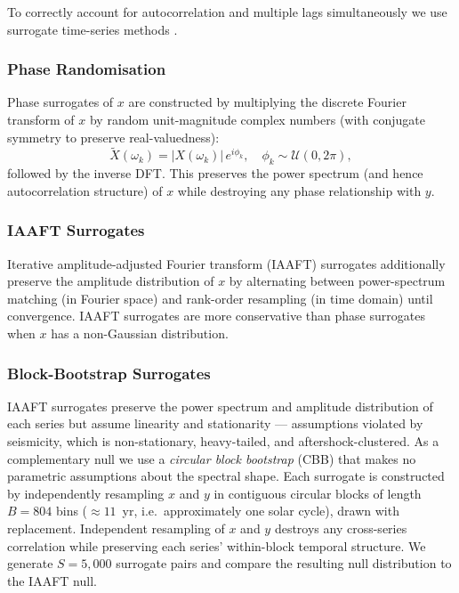 \documentclass[12pt,a4paper]{article}
\begin{document}
To correctly account for autocorrelation and multiple lags simultaneously we
use surrogate time-series methods \citep{Theiler1992,Schreiber2000}.

\subsubsection{Phase Randomisation}
\label{sec:phase}

Phase surrogates of $x$ are constructed by multiplying the discrete Fourier
transform of $x$ by random unit-magnitude complex numbers (with conjugate
symmetry to preserve real-valuedness):
\begin{equation}
  \tilde{X}(\omega_k) = |X(\omega_k)| \, e^{i\phi_k},
  \quad \phi_k \sim \mathcal{U}(0, 2\pi),
  \label{eq:phase}
\end{equation}
followed by the inverse DFT.
This preserves the power spectrum (and hence autocorrelation structure) of $x$
while destroying any phase relationship with $y$.

\subsubsection{IAAFT Surrogates}
\label{sec:iaaft}

Iterative amplitude-adjusted Fourier transform (IAAFT) surrogates
\citep{Schreiber2000} additionally preserve the amplitude distribution of $x$
by alternating between power-spectrum matching (in Fourier space) and
rank-order resampling (in time domain) until convergence.
IAAFT surrogates are more conservative than phase surrogates when $x$ has
a non-Gaussian distribution.

\subsubsection{Block-Bootstrap Surrogates}
\label{sec:blockbootstrap}

IAAFT surrogates preserve the power spectrum and amplitude distribution of each
series but assume linearity and stationarity --- assumptions violated by seismicity,
which is non-stationary, heavy-tailed, and aftershock-clustered.
As a complementary null we use a \emph{circular block bootstrap} (CBB) that
makes no parametric assumptions about the spectral shape.
Each surrogate is constructed by independently resampling $x$ and $y$ in
contiguous circular blocks of length $B = 804$ bins ($\approx 11$~yr,
i.e.\ approximately one solar cycle), drawn with replacement.
Independent resampling of $x$ and $y$ destroys any cross-series correlation
while preserving each series' within-block temporal structure.
We generate $S = 5{,}000$ surrogate pairs and compare the resulting null
distribution to the IAAFT null.
\end{document}
